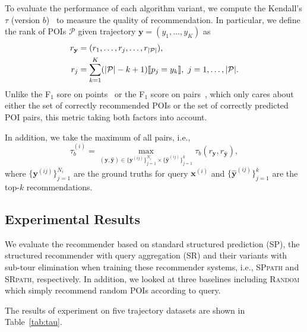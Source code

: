 To evaluate the performance of each algorithm variant, 
we compute the Kendall's $\tau$ (version $b$)~\cite{kendall1945,agresti2010analysis} to measure the quality of recommendation.
In particular,
we define the rank of POIs $\mathcal{P}$ given trajectory $\mathbf{y} = (y_1,\dots,y_K)$ as
\begin{align*} 
r_\mathbf{y} &= (r_1,\dots,r_j,\dots,r_{|\mathcal{P}|}), \\
r_j &= \sum_{k=1}^K (| \mathcal{P} | - k + 1)  \llbracket p_j = y_k \rrbracket, ~ j = 1, \dots, | \mathcal{P} |.
\end{align*}
Unlike the F$_1$ sore on points~\cite{ijcai15} or the F$_1$ score on pairs~\cite{cikm16paper}, 
which only cares about either the set of correctly recommended POIs or the set of correctly predicted POI pairs,
this metric taking both factors into account.

In addition, we take the maximum of all pairs,
i.e.,
\begin{equation*}
\tau_b^{(i)} = 
\max_{(\mathbf{y}, \hat{\mathbf{y}}) \in \{\mathbf{y}^{(ij)}\}_{j=1}^{N_i} \times \{\hat{\mathbf{y}}^{(ij)}\}_{j=1}^k} 
\tau_b(r_\mathbf{y}, r_{\hat{\mathbf{y}}}),
\end{equation*}
where $\{\mathbf{y}^{(ij)}\}_{j=1}^{N_i}$ are the ground truths for query $\mathbf{x}^{(i)}$ and
$\{\hat{\mathbf{y}}^{(ij)}\}_{j=1}^k$ are the top-$k$ recommendations.



\subsection{Experimental Results}
\label{sec:result}

We evaluate the recommender based on standard structured prediction (\textsc{SP}), 
the structured recommender with query aggregation (\textsc{SR}) and 
their variants with sub-tour elimination when training these recommender systems,
i.e., \textsc{SPpath} and \textsc{SRpath}, respectively.
In addition, we looked at three baselines including \textsc{Random} which simply recommend random POIs according to query.

The results of experiment on five trajectory datasets are shown in Table~\ref{tab:tau}.

